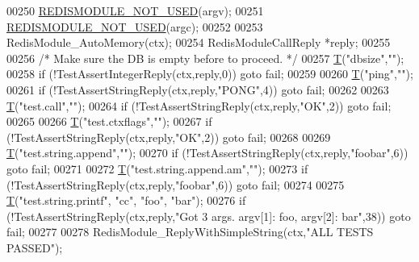 \begin{DoxyCode}
{{{{{{{00250     \hyperlink{redismodule_8h_a46d75d81383a00bd6b941af6cadf64c2}{REDISMODULE\_NOT\_USED}(argv);
00251     \hyperlink{redismodule_8h_a46d75d81383a00bd6b941af6cadf64c2}{REDISMODULE\_NOT\_USED}(argc);
00252 
00253     RedisModule\_AutoMemory(ctx);
00254     RedisModuleCallReply *reply;
00255 
00256     \textcolor{comment}{/* Make sure the DB is empty before to proceed. */}
00257     \hyperlink{testmodule_8c_a9834474b904750bc8258155c06efa705}{T}(\textcolor{stringliteral}{"dbsize"},\textcolor{stringliteral}{""});
00258     \textcolor{keywordflow}{if} (!TestAssertIntegerReply(ctx,reply,0)) \textcolor{keywordflow}{goto} fail;
00259 
00260     \hyperlink{testmodule_8c_a9834474b904750bc8258155c06efa705}{T}(\textcolor{stringliteral}{"ping"},\textcolor{stringliteral}{""});
00261     \textcolor{keywordflow}{if} (!TestAssertStringReply(ctx,reply,\textcolor{stringliteral}{"PONG"},4)) \textcolor{keywordflow}{goto} fail;
00262 
00263     \hyperlink{testmodule_8c_a9834474b904750bc8258155c06efa705}{T}(\textcolor{stringliteral}{"test.call"},\textcolor{stringliteral}{""});
00264     \textcolor{keywordflow}{if} (!TestAssertStringReply(ctx,reply,\textcolor{stringliteral}{"OK"},2)) \textcolor{keywordflow}{goto} fail;
00265 
00266     \hyperlink{testmodule_8c_a9834474b904750bc8258155c06efa705}{T}(\textcolor{stringliteral}{"test.ctxflags"},\textcolor{stringliteral}{""});
00267     \textcolor{keywordflow}{if} (!TestAssertStringReply(ctx,reply,\textcolor{stringliteral}{"OK"},2)) \textcolor{keywordflow}{goto} fail;
00268 
00269     \hyperlink{testmodule_8c_a9834474b904750bc8258155c06efa705}{T}(\textcolor{stringliteral}{"test.string.append"},\textcolor{stringliteral}{""});
00270     \textcolor{keywordflow}{if} (!TestAssertStringReply(ctx,reply,\textcolor{stringliteral}{"foobar"},6)) \textcolor{keywordflow}{goto} fail;
00271 
00272     \hyperlink{testmodule_8c_a9834474b904750bc8258155c06efa705}{T}(\textcolor{stringliteral}{"test.string.append.am"},\textcolor{stringliteral}{""});
00273     \textcolor{keywordflow}{if} (!TestAssertStringReply(ctx,reply,\textcolor{stringliteral}{"foobar"},6)) \textcolor{keywordflow}{goto} fail;
00274 
00275     \hyperlink{testmodule_8c_a9834474b904750bc8258155c06efa705}{T}(\textcolor{stringliteral}{"test.string.printf"}, \textcolor{stringliteral}{"cc"}, \textcolor{stringliteral}{"foo"}, \textcolor{stringliteral}{"bar"});
00276     \textcolor{keywordflow}{if} (!TestAssertStringReply(ctx,reply,\textcolor{stringliteral}{"Got 3 args. argv[1]: foo, argv[2]: bar"},38)) \textcolor{keywordflow}{goto} fail;
00277 
00278     RedisModule\_ReplyWithSimpleString(ctx,\textcolor{stringliteral}{"ALL TESTS PASSED"});
}}}}}}}
\end{DoxyCode}
